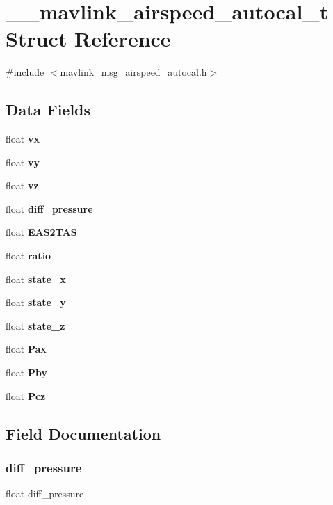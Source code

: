 \section{\+\_\+\+\_\+mavlink\+\_\+airspeed\+\_\+autocal\+\_\+t Struct Reference}
\label{struct____mavlink__airspeed__autocal__t}


{\ttfamily \#include $<$mavlink\+\_\+msg\+\_\+airspeed\+\_\+autocal.\+h$>$}

\subsection*{Data Fields}
\begin{DoxyCompactItemize}
\item 
float \textbf{ vx}
\item 
float \textbf{ vy}
\item 
float \textbf{ vz}
\item 
float \textbf{ diff\+\_\+pressure}
\item 
float \textbf{ E\+A\+S2\+T\+AS}
\item 
float \textbf{ ratio}
\item 
float \textbf{ state\+\_\+x}
\item 
float \textbf{ state\+\_\+y}
\item 
float \textbf{ state\+\_\+z}
\item 
float \textbf{ Pax}
\item 
float \textbf{ Pby}
\item 
float \textbf{ Pcz}
\end{DoxyCompactItemize}


\subsection{Field Documentation}
\mbox{\label{struct____mavlink__airspeed__autocal__t_a45742ea2c583eed869aca5c3a2b7ec4d}} 
\subsubsection{diff\+\_\+pressure}
{\footnotesize\ttfamily float diff\+\_\+pressure}

